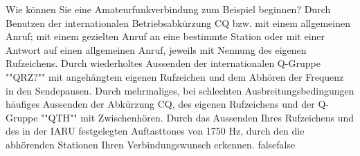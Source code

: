     {Wie können Sie eine Amateurfunkverbindung zum Beispiel beginnen?}
    {Durch Benutzen der internationalen Betriebsabkürzung CQ bzw. mit einem allgemeinen Anruf; mit einem gezielten Anruf an eine bestimmte Station oder mit einer Antwort auf einen allgemeinen Anruf, jeweils mit Nennung des eigenen Rufzeichens.}
    {Durch wiederholtes Aussenden der internationalen Q-Gruppe ""QRZ?"" mit angehängtem eigenen Rufzeichen und dem Abhören der Frequenz in den Sendepausen.}
    {Durch mehrmaliges, bei schlechten Ausbreitungsbedingungen häufiges Aussenden der Abkürzung CQ, des eigenen Rufzeichens und der Q-Gruppe ""QTH"" mit Zwischenhören.}
    {Durch das Aussenden Ihres Rufzeichens und des in der IARU festgelegten Auftasttones von 1750 Hz, durch den die abhörenden Stationen Ihren Verbindungswunsch erkennen.}
    {false}{false}